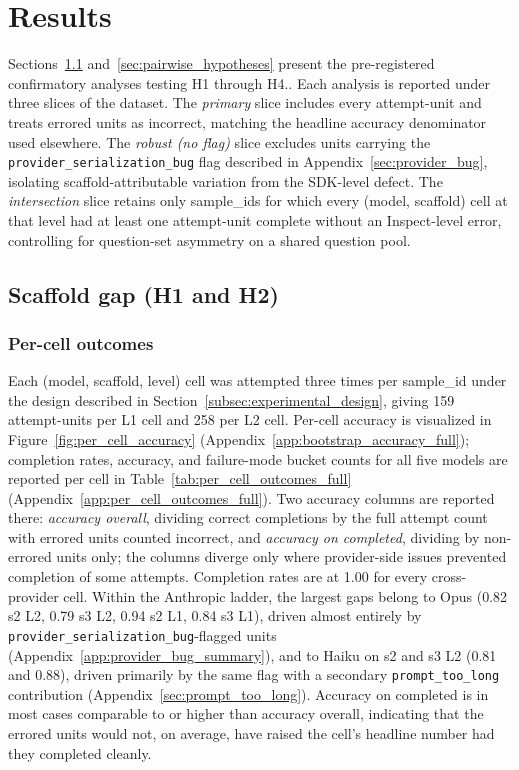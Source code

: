\documentclass[10pt]{article} %
\begin{document}
\section{Results}
    Sections~\ref{sec:scaffold_gap} and~\ref{sec:pairwise_hypotheses} present the pre-registered confirmatory analyses testing H1 through H4.. Each analysis is reported under three slices of the dataset. The \emph{primary} slice includes every attempt-unit and treats errored units as incorrect, matching the headline accuracy denominator used elsewhere. The \emph{robust (no flag)} slice excludes units carrying the \texttt{provider\_serialization\_bug} flag described in Appendix~\ref{sec:provider_bug}, isolating scaffold-attributable variation from the SDK-level defect. The \emph{intersection} slice retains only sample\_ids for which every (model, scaffold) cell at that level had at least one attempt-unit complete without an Inspect-level error, controlling for question-set asymmetry on a shared question pool.

    \subsection{Scaffold gap (H1 and H2)}\label{sec:scaffold_gap}

        \subsubsection{Per-cell outcomes}\label{sec:per_cell_outcomes}
            
            Each (model, scaffold, level) cell was attempted three times per sample\_id under the design described in Section~\ref{subsec:experimental_design}, giving 159 attempt-units per L1 cell and 258 per L2 cell. Per-cell accuracy is visualized in Figure~\ref{fig:per_cell_accuracy} (Appendix~\ref{app:bootstrap_accuracy_full}); completion rates, accuracy, and failure-mode bucket counts for all five models are reported per cell in Table~\ref{tab:per_cell_outcomes_full} (Appendix~\ref{app:per_cell_outcomes_full}). Two accuracy columns are reported there: \emph{accuracy overall}, dividing correct completions by the full attempt count with errored units counted incorrect, and \emph{accuracy on completed}, dividing by non-errored units only; the columns diverge only where provider-side issues prevented completion of some attempts. Completion rates are at 1.00 for every cross-provider cell. Within the Anthropic ladder, the largest gaps belong to Opus (0.82 s2 L2, 0.79 s3 L2, 0.94 s2 L1, 0.84 s3 L1), driven almost entirely by \texttt{provider\_serialization\_bug}-flagged units (Appendix~\ref{app:provider_bug_summary}), and to Haiku on s2 and s3 L2 (0.81 and 0.88), driven primarily by the same flag with a secondary \texttt{prompt\_too\_long} contribution (Appendix~\ref{sec:prompt_too_long}). Accuracy on completed is in most cases comparable to or higher than accuracy overall, indicating that the errored units would not, on average, have raised the cell's headline number had they completed cleanly.
\end{document}

